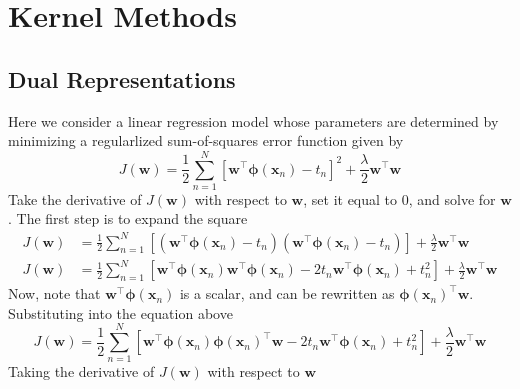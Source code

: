 \documentclass[12pt]{article}
\begin{document}
\section{Kernel Methods}
\subsection{Dual Representations}
Here we consider a linear regression model whose parameters are determined by
minimizing a regularlized sum-of-squares error function given by
%
\begin{equation*}
  J\left(\mathbf{w}\right) = \frac{1}{2} \sum \limits_{n=1}^N
  \left[\mathbf{w}^\top\mathbf{\phi}\left(\mathbf{x}_n\right) - t_n\right]^2 +
  \frac{\lambda}{2}\mathbf{w}^\top\mathbf{w}
\end{equation*}
%
Take the derivative of $J\left(\mathbf{w}\right)$ with respect to $\mathbf{w}$,
set it equal to $0$, and solve for $\mathbf{w}$. The first step is to expand
the square
%
\begin{align*}
  J\left(\mathbf{w}\right) &= \frac{1}{2} \sum \limits_{n=1}^N
  \left[
    \left(\mathbf{w}^\top\mathbf{\phi}\left(\mathbf{x}_n\right) - t_n\right)
    \left(\mathbf{w}^\top\mathbf{\phi}\left(\mathbf{x}_n\right) - t_n\right)
  \right] + \frac{\lambda}{2}\mathbf{w}^\top\mathbf{w} \\
  J\left(\mathbf{w}\right) &= \frac{1}{2} \sum \limits_{n=1}^N
  \left[
    \mathbf{w}^\top\mathbf{\phi}\left(\mathbf{x}_n\right)
    \mathbf{w}^\top\mathbf{\phi}\left(\mathbf{x}_n\right) -
    2t_n\mathbf{w}^\top\mathbf{\phi}\left(\mathbf{x}_n\right) +
    t_n^2
  \right] + \frac{\lambda}{2}\mathbf{w}^\top\mathbf{w}
\end{align*}
%
Now, note that $\mathbf{w}^\top\mathbf{\phi}\left(\mathbf{x}_n\right)$ is a
scalar, and can be rewritten as $\mathbf{\phi}\left(\mathbf{x}_n\right)^\top\mathbf{w}$. Substituting into the equation above
%
\begin{equation*}
  J\left(\mathbf{w}\right) = \frac{1}{2} \sum \limits_{n=1}^N
  \left[
    \mathbf{w}^\top\mathbf{\phi}\left(\mathbf{x}_n\right)
    \mathbf{\phi}\left(\mathbf{x}_n\right)^\top\mathbf{w} -
    2t_n\mathbf{w}^\top\mathbf{\phi}\left(\mathbf{x}_n\right) +
    t_n^2
  \right] + \frac{\lambda}{2}\mathbf{w}^\top\mathbf{w}
\end{equation*}
%
Taking the derivative of $J\left(\mathbf{w}\right)$ with respect to $\mathbf{w}$
%
\end{document}
